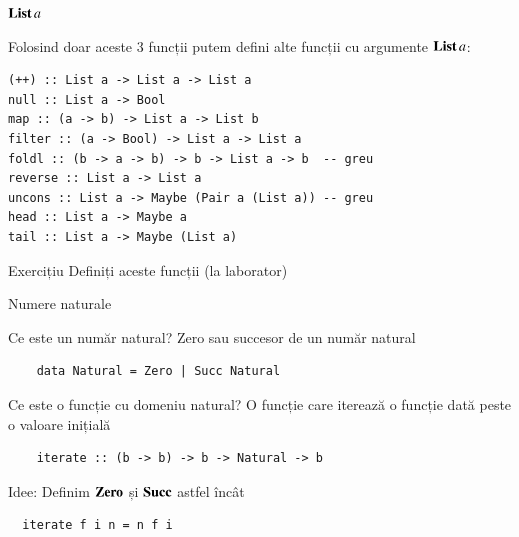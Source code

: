 \documentclass[xcolor=pdftex,romanian,colorlinks]{beamer}
\begin{document}
\begin{frame}[fragile]{$\mathop{\mathbf{List}}{a}$}

\begin{center}
  \hfill
  \hfill
\end{center}

Folosind doar aceste 3 funcții putem defini alte funcții cu argumente $\mathop{\mathbf{List}}{a}$:

\begin{lstlisting}
(++) :: List a -> List a -> List a
null :: List a -> Bool
map :: (a -> b) -> List a -> List b
filter :: (a -> Bool) -> List a -> List a
foldl :: (b -> a -> b) -> b -> List a -> b  -- greu
reverse :: List a -> List a
uncons :: List a -> Maybe (Pair a (List a)) -- greu 
head :: List a -> Maybe a
tail :: List a -> Maybe (List a)
\end{lstlisting}

\begin{alertblock}{Exercițiu}
Definiți aceste funcții (la laborator)
\end{alertblock}
\end{frame}

\begin{frame}[fragile]{Numere naturale}

\begin{block}{Ce este un număr natural?}
		Zero sau succesor de un număr natural
	\begin{lstlisting}
	data Natural = Zero | Succ Natural
	\end{lstlisting}
\end{block}

\begin{block}{Ce este o funcție cu domeniu natural?}
		O funcție care iterează o funcție dată peste o valoare inițială
	\begin{lstlisting}
	iterate :: (b -> b) -> b -> Natural -> b
	\end{lstlisting}
\end{block}

\begin{block}{Idee:
	Definim $\mathbf{Zero}$ și $\mathbf{Succ}$ astfel încât}
	\begin{lstlisting}
  iterate f i n = n f i
	\end{lstlisting}
\end{block}
\end{frame}
\end{document}

